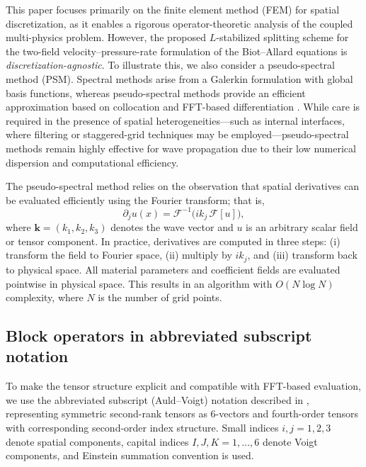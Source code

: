 \documentclass[pdflatex,sn-mathphys-num]{sn-jnl}
\theoremstyle{thmstyleone}%
\theoremstyle{thmstyletwo}%
\theoremstyle{thmstylethree}%
\theoremstyle{definition}
\begin{document}
	This paper focuses primarily on the finite element method (FEM) for spatial discretization, as it enables a rigorous operator-theoretic analysis of the coupled multi-physics problem. However, the proposed $L$-stabilized splitting scheme for the two-field velocity–pressure-rate formulation of the Biot–Allard equations is \emph{discretization-agnostic}. To illustrate this, we also consider a pseudo-spectral method (PSM).
	Spectral methods arise from a Galerkin formulation with global basis functions, whereas pseudo-spectral methods provide an efficient approximation based on collocation and FFT-based differentiation \cite{Gottlieb1977,Canuto1988,Fornberg1987,Kosloff1982}. 
	While care is required in the presence of spatial heterogeneities—such as internal interfaces, where filtering or staggered-grid techniques may be employed—pseudo-spectral methods remain highly effective for wave propagation due to their low numerical dispersion and computational efficiency. 
	
	The pseudo-spectral method relies on the observation that spatial derivatives can be evaluated efficiently using the Fourier transform; that is,
	\begin{equation}
		\partial_j u(x) = \mathcal{F}^{-1}\big( i k_j \,\mathcal{F}[u] \big),
		\label{PS_derivative}
	\end{equation} 
	where $\mathbf{k} = (k_1,k_2,k_3)$ denotes the wave vector and $u$ is an arbitrary scalar field or tensor component. 
	In practice, derivatives are computed in three steps: (i) transform the field to Fourier space, (ii) multiply by $i k_j$, and (iii) transform back to physical space. All material parameters and coefficient fields are evaluated pointwise in physical space. This results in an algorithm with $O(N\log N)$ complexity, where $N$ is the number of grid points.
	
	
	\subsection{Block operators in abbreviated subscript notation}
	
	To make the tensor structure explicit and compatible with FFT-based evaluation, we use the abbreviated subscript (Auld–Voigt) notation described in \cite{Auld1973, Carcione2022}, representing symmetric second-rank tensors as 6-vectors and fourth-order tensors with corresponding second-order index structure. Small indices $i,j = 1,2,3$ denote spatial components, capital indices $I,J,K = 1,\dots,6$ denote Voigt components, and Einstein summation convention is used.
	
\end{document}
